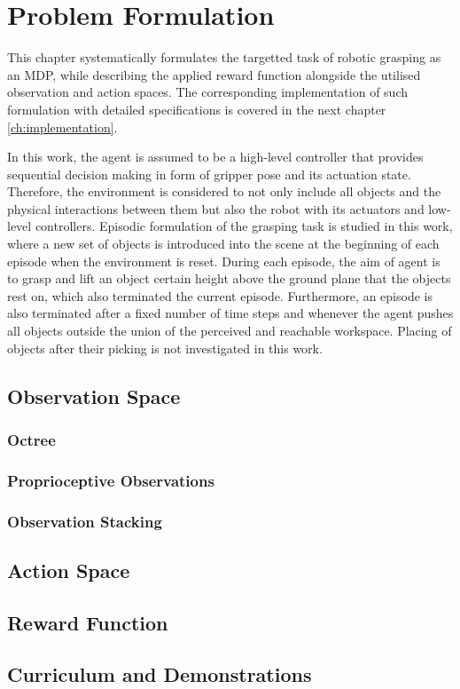 \chapter{Problem Formulation}\label{ch:problem_formulation}

This chapter systematically formulates the targetted task of robotic grasping as an MDP, while describing the applied reward function alongside the utilised observation and action spaces. The corresponding implementation of such formulation with detailed specifications is covered in the next chapter \autoref{ch:implementation}.

In this work, the agent is assumed to be a high-level controller that provides sequential decision making in form of gripper pose and its actuation state. Therefore, the environment is considered to not only include all objects and the physical interactions between them but also the robot with its actuators and low-level controllers. Episodic formulation of the grasping task is studied in this work, where a new set of objects is introduced into the scene at the beginning of each episode when the environment is reset. During each episode, the aim of agent is to grasp and lift an object certain height above the ground plane that the objects rest on, which also terminated the current episode. Furthermore, an episode is also terminated after a fixed number of time steps and whenever the agent pushes all objects outside the union of the perceived and reachable workspace. Placing of objects after their picking is not investigated in this work.


\section{Observation Space}

\subsection{Octree}

\subsection{Proprioceptive Observations}

\subsection{Observation Stacking}



\section{Action Space}



\section{Reward Function}



\section{Curriculum and Demonstrations}


